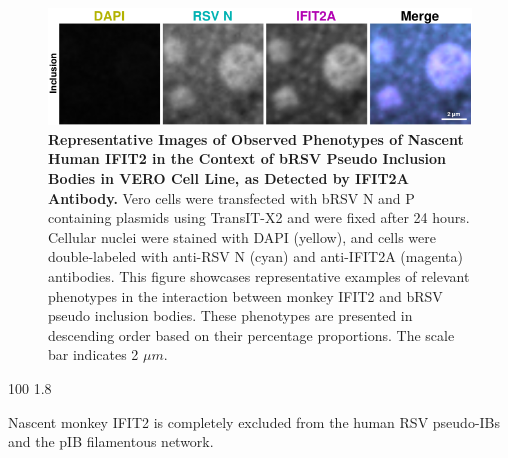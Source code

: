 \begin{figure}
    \centering
    \includegraphics[width=1\linewidth]{09. Chapter 4/Figs/02. pIB/02. IFIT2A/09. i2a-vero-bnbp.pdf} 
    \caption[Representative Images of Observed Phenotypes of Nascent Human IFIT2 in the Context of bRSV Pseudo Inclusion Bodies in VERO Cell Line, as Detected by IFIT2A Antibody.]{\textbf{Representative Images of Observed Phenotypes of Nascent Human IFIT2 in the Context of bRSV Pseudo Inclusion Bodies in VERO Cell Line, as Detected by IFIT2A Antibody.} Vero cells were transfected with bRSV N and P containing plasmids using TransIT-X2 and were fixed after 24 hours. Cellular nuclei were stained with DAPI (yellow), and cells were double-labeled with anti-RSV N (cyan) and anti-IFIT2A (magenta) antibodies. This figure showcases representative examples of relevant phenotypes in the interaction between monkey IFIT2 and bRSV pseudo inclusion bodies. These phenotypes are presented in descending order based on their percentage proportions. The scale bar indicates 2 \(\mu m\).}
    \label{fig:Representative Images of Observed Phenotypes of Nascent Human IFIT2 in the Context of bRSV Pseudo Inclusion Bodies in VERO Cell Line, as Detected by IFIT2A Antibody}
\end{figure}

100
1.8

Nascent monkey IFIT2 is completely excluded from the human RSV pseudo-IBs and the pIB filamentous network.

